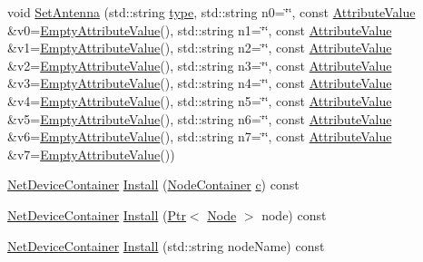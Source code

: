 \begin{DoxyCompactItemize}
void \hyperlink{classns3_1_1AdhocAlohaNoackIdealPhyHelper_aad947eabe238922f31376b7811b2a481}{Set\+Antenna} (std\+::string \hyperlink{visualizer-ideas_8txt_add98db9e15e2a58cf2b57623e7aa893a}{type}, std\+::string n0=\char`\"{}\char`\"{}, const \hyperlink{classns3_1_1AttributeValue}{Attribute\+Value} \&v0=\hyperlink{classns3_1_1EmptyAttributeValue}{Empty\+Attribute\+Value}(), std\+::string n1=\char`\"{}\char`\"{}, const \hyperlink{classns3_1_1AttributeValue}{Attribute\+Value} \&v1=\hyperlink{classns3_1_1EmptyAttributeValue}{Empty\+Attribute\+Value}(), std\+::string n2=\char`\"{}\char`\"{}, const \hyperlink{classns3_1_1AttributeValue}{Attribute\+Value} \&v2=\hyperlink{classns3_1_1EmptyAttributeValue}{Empty\+Attribute\+Value}(), std\+::string n3=\char`\"{}\char`\"{}, const \hyperlink{classns3_1_1AttributeValue}{Attribute\+Value} \&v3=\hyperlink{classns3_1_1EmptyAttributeValue}{Empty\+Attribute\+Value}(), std\+::string n4=\char`\"{}\char`\"{}, const \hyperlink{classns3_1_1AttributeValue}{Attribute\+Value} \&v4=\hyperlink{classns3_1_1EmptyAttributeValue}{Empty\+Attribute\+Value}(), std\+::string n5=\char`\"{}\char`\"{}, const \hyperlink{classns3_1_1AttributeValue}{Attribute\+Value} \&v5=\hyperlink{classns3_1_1EmptyAttributeValue}{Empty\+Attribute\+Value}(), std\+::string n6=\char`\"{}\char`\"{}, const \hyperlink{classns3_1_1AttributeValue}{Attribute\+Value} \&v6=\hyperlink{classns3_1_1EmptyAttributeValue}{Empty\+Attribute\+Value}(), std\+::string n7=\char`\"{}\char`\"{}, const \hyperlink{classns3_1_1AttributeValue}{Attribute\+Value} \&v7=\hyperlink{classns3_1_1EmptyAttributeValue}{Empty\+Attribute\+Value}())
\item 
\hyperlink{classns3_1_1NetDeviceContainer}{Net\+Device\+Container} \hyperlink{classns3_1_1AdhocAlohaNoackIdealPhyHelper_a0b9cb9d602fd1027f7f39a776e745abe}{Install} (\hyperlink{classns3_1_1NodeContainer}{Node\+Container} \hyperlink{mmwave_2model_2fading-traces_2fading__trace__generator_8m_ae0323a9039add2978bf5b49550572c7c}{c}) const 
\item 
\hyperlink{classns3_1_1NetDeviceContainer}{Net\+Device\+Container} \hyperlink{classns3_1_1AdhocAlohaNoackIdealPhyHelper_a0bf28aa54025637e841b720674e3d370}{Install} (\hyperlink{classns3_1_1Ptr}{Ptr}$<$ \hyperlink{classns3_1_1Node}{Node} $>$ node) const 
\item 
\hyperlink{classns3_1_1NetDeviceContainer}{Net\+Device\+Container} \hyperlink{classns3_1_1AdhocAlohaNoackIdealPhyHelper_a7cc5a0acb43f7315cfacf537a4ecb1f1}{Install} (std\+::string node\+Name) const 
\end{DoxyCompactItemize}
